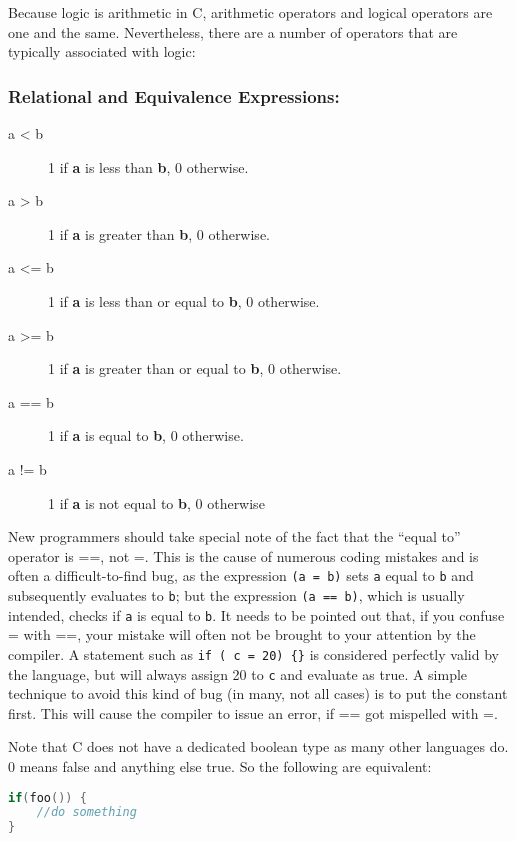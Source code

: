 Because logic is arithmetic in C, arithmetic operators and logical operators
are one and the same. Nevertheless, there are a number of operators that are
typically associated with logic:

\subsubsection{Relational and Equivalence Expressions:}
\begin{description}
	\item[a \textless{} b] 1 if \textbf{a} is less than \textbf{b}, 0 otherwise.
	\item[a \textgreater{} b] 1 if \textbf{a} is greater than \textbf{b}, 0 otherwise.
	\item[a \textless{}= b] 1 if \textbf{a} is less than or equal to \textbf{b}, 0 otherwise.
	\item[a \textgreater{}= b] 1 if \textbf{a} is greater than or equal to \textbf{b}, 0 otherwise.
	\item[a == b] 1 if \textbf{a} is equal to \textbf{b}, 0 otherwise.
	\item[a != b] 1 if \textbf{a} is not equal to \textbf{b}, 0 otherwise
\end{description}

New programmers should take special note of the fact that the ``equal to''
operator is ==, not =. This is the cause of numerous coding mistakes and is
often a difficult-to-find bug, as the expression \texttt{(a = b)} sets
\texttt{a} equal to \texttt{b} and subsequently evaluates to \texttt{b}; but
the expression \texttt{(a == b)}, which is usually intended, checks if
\texttt{a} is equal to \texttt{b}. It needs to be pointed out that, if you
confuse = with ==, your mistake will often not be brought to your attention by
the compiler. A statement such as \texttt{if ( c = 20) \{\}} is considered
perfectly valid by the language, but will always assign 20 to \texttt{c} and
evaluate as true. A simple technique to avoid this kind of bug (in many, not
all cases) is to put the constant first. This will cause the compiler to issue
an error, if == got mispelled with =.

Note that C does not have a dedicated boolean type as many other languages do.
0 means false and anything else true. So the following are equivalent:
\lstset{basicstyle=\scriptsize, numbers=left, captionpos=b, tabsize=4}
\begin{lstlisting}[caption=Section \thesection listing \arabic{controlcnt},language={C},
breaklines=true,xleftmargin=15pt, label=lst:section\thesection listing\arabic{controlcnt}]
if(foo()) {
	//do something
}
\end{lstlisting}

